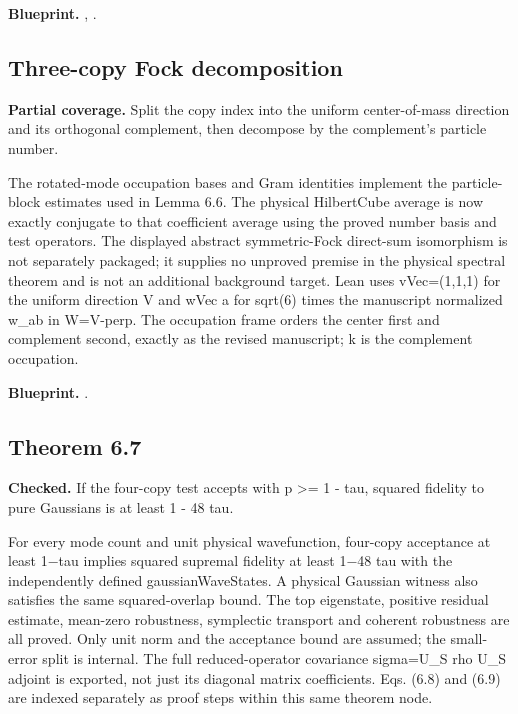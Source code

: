 \textbf{Blueprint.} , .

\subsection{Three-copy Fock decomposition}\label{paper:three-copy-fock}
\textbf{Partial coverage.} Split the copy index into the uniform center-of-mass direction and its orthogonal complement, then decompose by the complement's particle number. 

The rotated-mode occupation bases and Gram identities implement the particle-block estimates used in Lemma 6.6. The physical HilbertCube average is now exactly conjugate to that coefficient average using the proved number basis and test operators. The displayed abstract symmetric-Fock direct-sum isomorphism is not separately packaged; it supplies no unproved premise in the physical spectral theorem and is not an additional background target. Lean uses vVec=(1,1,1) for the uniform direction V and wVec a for sqrt(6) times the manuscript normalized w\_ab in W=V-perp. The occupation frame orders the center first and complement second, exactly as the revised manuscript; k is the complement occupation.


\textbf{Blueprint.} .

\subsection{Theorem 6.7}\label{paper:r6-7}
\textbf{Checked.} If the four-copy test accepts with p >= 1 - tau, squared fidelity to pure Gaussians is at least 1 - 48 tau. 

For every mode count and unit physical wavefunction, four-copy acceptance at least 1−tau implies squared supremal fidelity at least 1−48 tau with the independently defined gaussianWaveStates. A physical Gaussian witness also satisfies the same squared-overlap bound. The top eigenstate, positive residual estimate, mean-zero robustness, symplectic transport and coherent robustness are all proved. Only unit norm and the acceptance bound are assumed; the small-error split is internal. The full reduced-operator covariance sigma=U\_S rho U\_S adjoint is exported, not just its diagonal matrix coefficients. Eqs. (6.8) and (6.9) are indexed separately as proof steps within this same theorem node.

